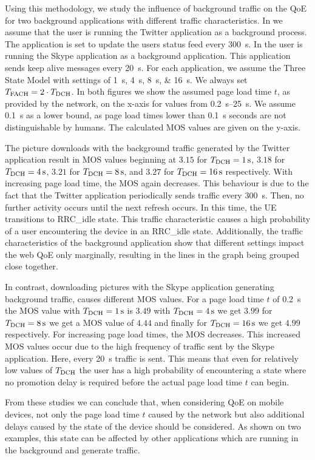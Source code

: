 Using this methodology, we study the influence of background traffic on the \gls{QoE} for two background applications with different traffic characteristics.
In  we assume that the user is running the Twitter application as a background process.
The application is set to update the users status feed every \SI{300}{\second}.
In  the user is running the Skype application as a background application.
This application sends keep alive messages every \SI{20}{\second}.
For each application, we assume the Three State Model with \TDCH settings of \SIlist{1;4;8;16}{\second}.
We always set \(T_{\text{FACH}} = 2\cdot T_{\text{DCH}}\).
In both figures we show the assumed page load time \(t\), as provided by the network, on the x-axis for values from \SIrange{0.2}{25}{\second}.
We assume \SI{0.1}{\second} as a lower bound, as page load times lower than \SI{0.1}{\second} seconds are not distinguishable \cite{egger2012b} by humans.
The calculated \gls{MOS} values are given on the y-axis.

The picture downloads with the background traffic generated by the Twitter application result in \gls{MOS} values beginning at \(3.15\) for \(T_{\text{DCH}} = \SI{1}{\second}\), \(3.18\) for \(T_{\text{DCH}} = \SI{4}{\second}\), \(3.21\) for \(T_{\text{DCH}} = \SI{8}{\second}\), and \(3.27\) for \(T_{\text{DCH}} = \SI{16}{\second}\) respectively.
With increasing page load time, the \gls{MOS} again decreases.
This behaviour is due to the fact that the Twitter application periodically sends traffic every \SI{300}{\second}.
Then, no further activity occurs until the next refresh occurs.
In this time, the \gls{UE} transitions to \gls{RRC_idle} state.
This traffic characteristic causes a high probability of a user encountering the device in an \gls{RRC_idle} state.
Additionally, the traffic characteristics of the background application show that different \TDCH settings impact the web \gls{QoE} only marginally, resulting in the lines in the graph being grouped close together.

In contrast, downloading pictures with the Skype application generating background traffic, causes different \gls{MOS} values.
For a page load time \(t\) of \SI{0.2}{\second} the \gls{MOS} value with \(T_{\text{DCH}} = \SI{1}{\second}\) is \(3.49\) with \(T_{\text{DCH}} = \SI{4}{\second}\) we get \(3.99\) for \(T_{\text{DCH}} = \SI{8}{\second}\) we get a \gls{MOS} value of \(4.44\) and finally for \(T_{\text{DCH}} = \SI{16}{\second}\) we get \(4.99\) respectively.
For increasing page load times, the \gls{MOS} decreases.
This increased \gls{MOS} values occur due to the high frequency of traffic sent by the Skype application.
Here, every \SI{20}{\second} traffic is sent.
This means that even for relatively low values of \(T_{\text{DCH}}\) the user has a high probability of encountering a state where no promotion delay is required before the actual page load time \(t\) can begin.

From these studies we can conclude that, when considering \gls{QoE} on mobile devices, not only the page load time \(t\) caused by the network but also additional delays caused by the state of the device should be considered.
As shown on two examples, this state can be affected by other applications which are running in the background and generate traffic.
